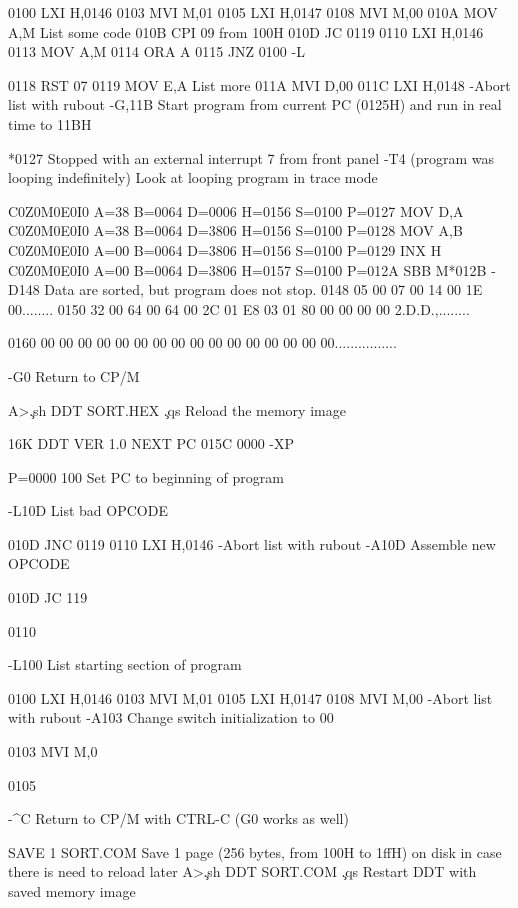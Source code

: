  0100   LXI H,0146
 0103   MVI M,01
 0105   LXI H,0147
 0108   MVI M,00
 010A   MOV A,M        List some code
 010B   CPI 09         from 100H
 010D   JC  0119
 0110   LXI H,0146
 0113   MOV A,M
 0114   ORA A
 0115   JNZ 0100
 -L

 0118   RST 07
 0119   MOV E,A        List more
 011A   MVI D,00
 011C   LXI H,0148
-Abort list with rubout
-G,11B    Start program from current PC (0125H) 
          and run in real time to 11BH



*0127   Stopped with an external interrupt 7 from front panel 
-T4                        (program was looping indefinitely)
      Look at looping program in trace mode

C0Z0M0E0I0 A=38 B=0064 D=0006 H=0156 S=0100 P=0127 MOV D,A
C0Z0M0E0I0 A=38 B=0064 D=3806 H=0156 S=0100 P=0128 MOV A,B
C0Z0M0E0I0 A=00 B=0064 D=3806 H=0156 S=0100 P=0129 INX H
C0Z0M0E0I0 A=00 B=0064 D=3806 H=0157 S=0100 P=012A SBB M*012B
-D148
                        Data are sorted, but program does not stop.
0148 05 00 07 00 14 00 1E 00........
0150 32 00 64 00 64 00 2C 01 E8 03 01 80 00 00 00 00 2.D.D.,........

0160 00 00 00 00 00 00 00 00 00 00 00 00 00 00 00 00................

-G0    Return to CP/M

A>\c
.sh
DDT SORT.HEX    \c
.qs
Reload the memory image

16K DDT VER 1.0
NEXT PC
015C 0000
-XP

P=0000 100    Set PC to beginning of program

-L10D   List bad OPCODE

 010D   JNC 0119
 0110   LXI H,0146
-Abort list with rubout
-A10D    Assemble new OPCODE

010D JC 119

0110

-L100   List starting section of program

 0100   LXI H,0146
 0103   MVI M,01
 0105   LXI H,0147
 0108   MVI M,00
-Abort list with rubout
-A103    Change switch initialization to 00

0103 MVI M,0

0105

-^C  Return to CP/M with CTRL-C (G0 works as well)

SAVE 1 SORT.COM     Save 1 page (256 bytes, from 100H to 1ffH) on 
                    disk in case there is need to reload later
A>\c
.sh
DDT SORT.COM      \c
.qs
Restart DDT with saved memory image

